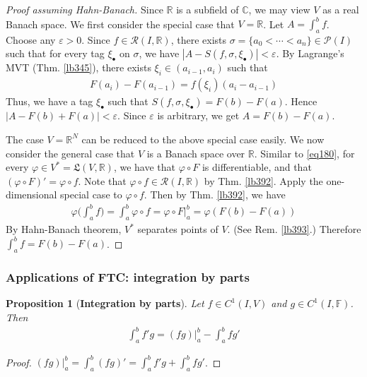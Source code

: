 \documentclass[12pt,b5paper,notitlepage]{article}
\theoremstyle{definition}
\theoremstyle{plain}
\newtheorem{pp}[df]{Proposition}
\newcommand{\fk}{\mathfrak}
\newcommand{\mc}{\mathcal}
\newcommand{\scr}{\mathscr}
\newcommand{\blt}{\bullet}
\newcommand{\Cbb}{\mathbb C}
\newcommand{\Rbb}{\mathbb R}
\newcommand{\Fbb}{\mathbb F}
\newcommand{\eps}{\varepsilon}
\numberwithin{equation}{section}
\begin{document}
\begin{proof}[Proof assuming Hahn-Banach]
Since $\Rbb$ is a subfield of $\Cbb$, we may view $V$ as a real Banach space. We first consider the special case that $V=\Rbb$. Let $A=\int_a^bf$. Choose any $\eps>0$. Since $f\in\scr R(I,\Rbb)$, there exists $\sigma=\{a_0<\cdots<a_n\}\in\mc P(I)$ such that for every tag $\xi_\blt$ on $\sigma$, we have $|A-S(f,\sigma,\xi_\blt)|<\eps$. By Lagrange's MVT (Thm. \ref{lb345}), there exists $\xi_i\in (a_{i-1},a_i)$ such that
\begin{align*}
F(a_i)-F(a_{i-1})=f(\xi_i)(a_i-a_{i-1})
\end{align*}
Thus, we have a tag $\xi_\blt$ such that $S(f,\sigma,\xi_\blt)=F(b)-F(a)$. Hence $|A-F(b)+F(a)|<\eps$. Since $\eps$ is arbitrary, we get $A=F(b)-F(a)$.

The case $V=\Rbb^N$ can be reduced to the above special case easily. We now consider the general case that $V$ is a Banach space over $\Rbb$. Similar to \eqref{eq180}, for every $\varphi\in V^*=\fk L(V,\Rbb)$,  we have that $\varphi\circ F$ is differentiable, and that $(\varphi\circ F)'=\varphi\circ f$. Note that $\varphi\circ f\in\scr R(I,\Rbb)$ by Thm. \ref{lb392}. Apply the one-dimensional special case to $\varphi\circ f$. Then by Thm. \ref{lb392}, we have
\begin{align*}
\varphi\Big(\int_a^b f\Big)=\int_a^b \varphi\circ f=\varphi\circ F\big|_a^b=\varphi(F(b)-F(a))
\end{align*}
By Hahn-Banach theorem, $V^*$ separates points of $V$. (See Rem. \ref{lb393}.) Therefore $\int_a^b f=F(b)-F(a)$.
\end{proof}




\subsubsection{Applications of FTC: integration by parts}




\begin{pp}[\textbf{Integration by parts}]  
Let $f\in C^1(I,V)$ and $g\in C^1(I,\Fbb)$. Then
\begin{align}
\int_a^b f'g=(fg)\big|_a^b-\int_a^b fg'
\end{align}
\end{pp}


\begin{proof}
$(fg)\big|_a^b=\int_a^b(fg)'=\int_a^bf'g+\int_a^b fg'$.
\end{proof}
\end{document}
